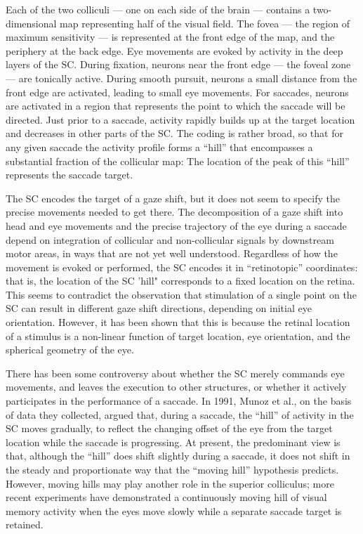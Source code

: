 \documentclass[]{book}
\begin{document}
Each of the two colliculi --- one on each side of the brain --- contains a two-dimensional map representing half of the visual field. The fovea --- the region of maximum sensitivity --- is represented at the front edge of the map, and the periphery at the back edge. Eye movements are evoked by activity in the deep layers of the SC. During fixation, neurons near the front edge --- the foveal zone --- are tonically active. During smooth pursuit, neurons a small distance from the front edge are activated, leading to small eye movements. For saccades, neurons are activated in a region that represents the point to which the saccade will be directed. Just prior to a saccade, activity rapidly builds up at the target location and decreases in other parts of the SC. The coding is rather broad, so that for any given saccade the activity profile forms a ``hill'' that encompasses a substantial fraction of the collicular map: The location of the peak of this ``hill'' represents the saccade target.

The SC encodes the target of a gaze shift, but it does not seem to specify the precise movements needed to get there. The decomposition of a gaze shift into head and eye movements and the precise trajectory of the eye during a saccade depend on integration of collicular and non-collicular signals by downstream motor areas, in ways that are not yet well understood. Regardless of how the movement is evoked or performed, the SC encodes it in ``retinotopic'' coordinates: that is, the location of the SC 'hill" corresponds to a fixed location on the retina. This seems to contradict the observation that stimulation of a single point on the SC can result in different gaze shift directions, depending on initial eye orientation. However, it has been shown that this is because the retinal location of a stimulus is a non-linear function of target location, eye orientation, and the spherical geometry of the eye.

There has been some controversy about whether the SC merely commands eye movements, and leaves the execution to other structures, or whether it actively participates in the performance of a saccade. In 1991, Munoz et al., on the basis of data they collected, argued that, during a saccade, the ``hill'' of activity in the SC moves gradually, to reflect the changing offset of the eye from the target location while the saccade is progressing. At present, the predominant view is that, although the ``hill'' does shift slightly during a saccade, it does not shift in the steady and proportionate way that the ``moving hill'' hypothesis predicts. However, moving hills may play another role in the superior colliculus; more recent experiments have demonstrated a continuously moving hill of visual memory activity when the eyes move slowly while a separate saccade target is retained.
\end{document}
